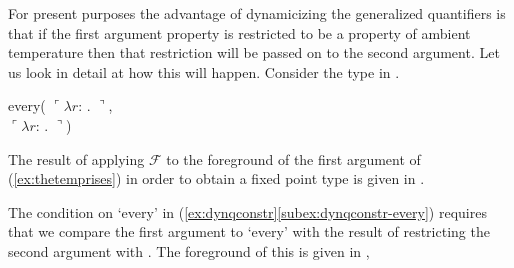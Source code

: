 For present purposes the advantage of dynamicizing the generalized
quantifiers is that if the first argument property is restricted to be
a property of ambient temperature then that restriction will be passed
on to the second argument.  Let us look in detail at how this will
happen.  Consider the type in \nexteg{}.
\begin{ex}

every(
$\ulcorner\lambda r$: . 
            $\urcorner$, \\ 
\hspace*{2.4em} 
$\ulcorner\lambda r$: . 
            $\urcorner$)

\label{ex:thetemprises}
\end{ex} 
The result of applying $\mathcal{F}$ to the foreground of the first argument of (\ref{ex:thetemprises}) in
order to obtain a fixed point type is given in \nexteg{}.
\begin{ex} 
\end{ex} 
The condition on `every' in
(\ref{ex:dynqconstr}\ref{subex:dynqconstr-every}) requires that we
compare the first argument to `every' with the result of restricting
the second argument with \preveg{}.  The foreground of this is given in ,
